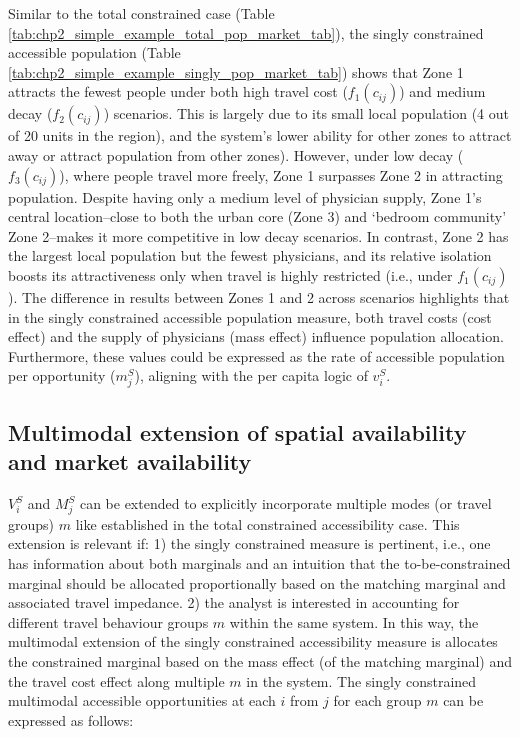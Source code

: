 \documentclass[
11pt, %
oneside, %
english, %
singlespacing, %
]{macthesis} %
\begin{document}


Similar to the total constrained case (Table \ref{tab:chp2_simple_example_total_pop_market_tab}), the singly constrained accessible population (Table \ref{tab:chp2_simple_example_singly_pop_market_tab}) shows that Zone 1 attracts the fewest people under both high travel cost (\(f_1(c_{ij})\)) and medium decay (\(f_2(c_{ij})\)) scenarios. This is largely due to its small local population (4 out of 20 units in the region), and the system's lower ability for other zones to attract away or attract population from other zones). However, under low decay (\(f_3(c_{ij})\)), where people travel more freely, Zone 1 surpasses Zone 2 in attracting population. Despite having only a medium level of physician supply, Zone 1's central location--close to both the urban core (Zone 3) and `bedroom community' Zone 2--makes it more competitive in low decay scenarios. In contrast, Zone 2 has the largest local population but the fewest physicians, and its relative isolation boosts its attractiveness only when travel is highly restricted (i.e., under \(f_1(c_{ij})\)). The difference in results between Zones 1 and 2 across scenarios highlights that in the singly constrained accessible population measure, both travel costs (cost effect) and the supply of physicians (mass effect) influence population allocation. Furthermore, these values could be expressed as the rate of accessible population per opportunity (\(m_j^S\)), aligning with the per capita logic of \(v_i^S\).

\subsection{Multimodal extension of spatial availability and market availability}\label{multimodal-extension-of-spatial-availability-and-market-availability}

\(V^{S}_i\) and \(M^{S}_j\) can be extended to explicitly incorporate multiple modes (or travel groups) \(m\) like established in the total constrained accessibility case. This extension is relevant if: 1) the singly constrained measure is pertinent, i.e., one has information about both marginals and an intuition that the to-be-constrained marginal should be allocated proportionally based on the matching marginal and associated travel impedance. 2) the analyst is interested in accounting for different travel behaviour groups \(m\) within the same system. In this way, the multimodal extension of the singly constrained accessibility measure is allocates the constrained marginal based on the mass effect (of the matching marginal) and the travel cost effect along multiple \(m\) in the system. The singly constrained multimodal accessible opportunities at each \(i\) from \(j\) for each group \(m\) can be expressed as follows:
\end{document}
